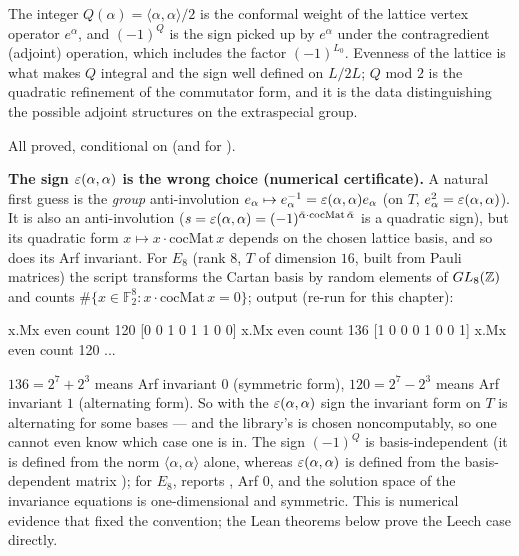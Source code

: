 \begin{physics}
The integer $Q(\alpha)=\langle\alpha,\alpha\rangle/2$ is the conformal weight of the lattice vertex operator $e^{\alpha}$, and $(-1)^{Q}$ is the sign picked up by $e^{\alpha}$ under the contragredient (adjoint) operation, which includes the factor $(-1)^{L_0}$. Evenness of the lattice is what makes $Q$ integral and the sign well defined on $L/2L$; $Q$ mod $2$ is the quadratic refinement of the commutator form, and it is the data distinguishing the possible adjoint structures on the extraspecial group.
\end{physics}
\begin{status}
All proved, conditional on  (and  for ).
\end{status}

\begin{warning}
\textbf{The sign $\varepsilon(\alpha,\alpha)$ is the wrong choice (numerical certificate).}  A natural
first guess is the \emph{group} anti-involution $e_\alpha\mapsto e_\alpha^{-1}=\varepsilon(\alpha,
\alpha)e_\alpha$ (on $T$, $e_\alpha^2=\varepsilon(\alpha,\alpha)$).  It is also an anti-involution
($s=\varepsilon(\alpha,\alpha)=(-1)^{\bar\alpha\cdot\mathrm{cocMat}\,\bar\alpha}$ is a quadratic sign),
but its quadratic form $x\mapsto x\cdot\mathrm{cocMat}\,x$ depends on the chosen lattice basis, and
so does its Arf invariant.  For $E_8$ (rank $8$, $T$ of dimension $16$, built from Pauli matrices)
the script  transforms the Cartan basis by random
elements of $GL_8({\mathbb{Z}})$ and counts $\#\{x\in\mathbb F_2^8: x\cdot\mathrm{cocMat}\,x=0\}$; output
(re-run for this chapter):
\begin{plaincode}
[0 0 1 1 1 1 1 0] x.Mx even count 120
[0 0 1 0 1 1 0 0] x.Mx even count 136
[1 0 0 0 1 0 0 1] x.Mx even count 120
...
\end{plaincode}
$136=2^7+2^3$ means Arf invariant $0$ (symmetric form), $120=2^7-2^3$ means Arf invariant $1$
(alternating form).  So with the $\varepsilon(\alpha,\alpha)$ sign the invariant form on $T$ is
alternating for some bases --- and the library's  is chosen noncomputably, so one
cannot even know which case one is in.  The sign $(-1)^Q$ is basis-independent (it is defined from the norm
$\langle\alpha,\alpha\rangle$ alone, whereas $\varepsilon(\alpha,\alpha)$ is defined from the
basis-dependent matrix ); for $E_8$,
 reports , Arf $0$, and the solution space of the
invariance equations is one-dimensional and symmetric.  This is numerical evidence that fixed the
convention; the Lean theorems below prove the Leech case directly.
\end{warning}

